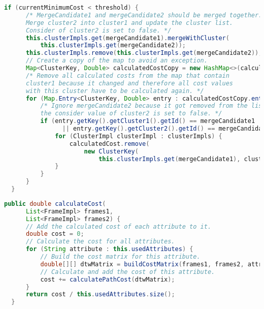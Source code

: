 \begin{lstfloat}
\begin{lstlisting}[language=Java, label={lst:ClustMerge}, caption=Cluster-Methode: Mergevorgang.]
  if (currentMinimumCost < threshold) {
      /* MergeCandidate1 and mergeCandidate2 should be merged together.
      Merge cluster2 into cluster1 and update the cluster list.
      Consider of cluster2 is set to false. */
      this.clusterImpls.get(mergeCandidate1).mergeWithCluster(
          this.clusterImpls.get(mergeCandidate2));  
      this.clusterImpls.remove(this.clusterImpls.get(mergeCandidate2));
      // Create a copy of the map to avoid an exception.
      Map<ClusterKey, Double> calculatedCostCopy = new HashMap<>(calculatedCost); 
      /* Remove all calculated costs from the map that contain
      cluster1 because it changed and therefore all cost values
      with this cluster have to be calculated again. */
      for (Map.Entry<ClusterKey, Double> entry : calculatedCostCopy.entrySet()) {
          /* Ignore mergeCandidate2 because it got removed from the list and
          the consider value of cluster2 is set to false. */
          if (entry.getKey().getCluster1().getId() == mergeCandidate1
                || entry.getKey().getCluster2().getId() == mergeCandidate1) {
              for (ClusterImpl clusterImpl : clusterImpls) {
                  calculatedCost.remove(
                      new ClusterKey(
                          this.clusterImpls.get(mergeCandidate1), clusterImpl));
              }
          }
      }
  }
\end{lstlisting}
\end{lstfloat}
\begin{lstfloat}
\begin{lstlisting}[language=Java, label={lst:DtwCalc}, caption=DTW: Berechnung der Kosten.]
  public double calculateCost(
      List<FrameImpl> frames1,
      List<FrameImpl> frames2) {
      // Add the calculated cost of each attribute to it.
      double cost = 0;
      // Calculate the cost for all attributes.
      for (String attribute : this.usedAttributes) {
          // Build the cost matrix for this attribute.
          double[][] dtwMatrix = buildCostMatrix(frames1, frames2, attribute);
          // Calculate and add the cost of this attribute.
          cost += calculatePathCost(dtwMatrix);
      }
      return cost / this.usedAttributes.size();
  }
\end{lstlisting}
\end{lstfloat}
